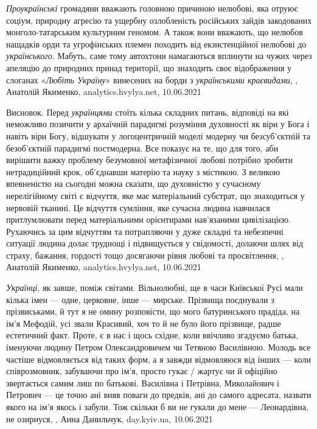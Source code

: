 \emph{Проукраїнські} громадяни вважають головною причиною нелюбові, яка отруює соціум,
природну агресію та ущербну озлобленість російських зайдів закодованих
монголо-татарським культурним геномом. А також вони вважають, що нелюбов
нащадків орди та угрофінських племен походить від екзистенційної нелюбові до
\emph{українського}. Мабуть, саме тому автохтони намагаються вплинути на чужих через
апеляцію до природних принад території, що знаходить своє відображення у
слоганах «\emph{Любіть Україну}» винесених на борди з \emph{українськими краєвидами},
, Анатолій Якименко, analytics.hvylya.net, 10.06.2021

Висновок. Перед \emph{українцями} стоїть кілька складних питань, відповіді на які
неможливо позичити у архаїчній парадигмі розуміння духовності як віри у Бога і
навіть віри Богу, відшукати у логоцентричній моделі модерну чи безсуб’єктній та
безоб’єктній парадигмі постмодерна. Все показує на те, що для того, аби
вирішити важку проблему безумовної метафізичної любові потрібно зробити
нетрадиційний крок, об’єднавши матерію та науку з містикою. З великою
впевненістю на сьогодні можна сказати, що духовністю у сучасному нерелігійному
світі є відчуття, яке має матеріальний субстрат, що знаходиться у нервовій
тканині. Це відчуття сумління, яке сучасна людина навчилася притлумлювати перед
матеріальними орієнтирами нав’язаними цивілізацією. Рухаючись за цим відчуттям
та потрапляючи у дуже складні та небезпечні ситуації людина долає труднощі і
підвищується у свідомості, долаючи шлях від страху, бажання, гордості тощо
досягаючи рівня любові та просвітлення,
, Анатолій Якименко, analytics.hvylya.net, 10.06.2021

\emph{Українці}, як завше, поміж світами. Вільнолюбні, ще в часи Київської Русі мали
кілька імен — одне, церковне, інше — мирське. Прізвища поєднували з
прізвиськами, й тут я не омину розповісти, що мого батуринського прадіда, на
ім'я Мефодій, усі звали Красивий, хоч то й не було його прізвище, радше
естетичний факт. Проте, є в нас і щось східне, коли ввічливо згадуємо батька,
іменуючи людину Петром Олександровичем чи Тетяною Василівною. Молодь все
частіше відмовляється від таких форм, а я завжди відмовляюся від інших — коли
співрозмовник, забуваючи про ім’я, просто гукає / жартує  чи й офіційно
звертається самим лиш по батькові. Василівна і Петрівна, Миколайович і Петрович
— це точно ані вияв поваги до предків, ані до самого адресата, назвати якого на
ім'я якось і забули. Тож скільки б ви не гукали до мене — Леонардівна, не
озирнуся,
, Анна Данильчук, day.kyiv.ua, 10.06.2021

